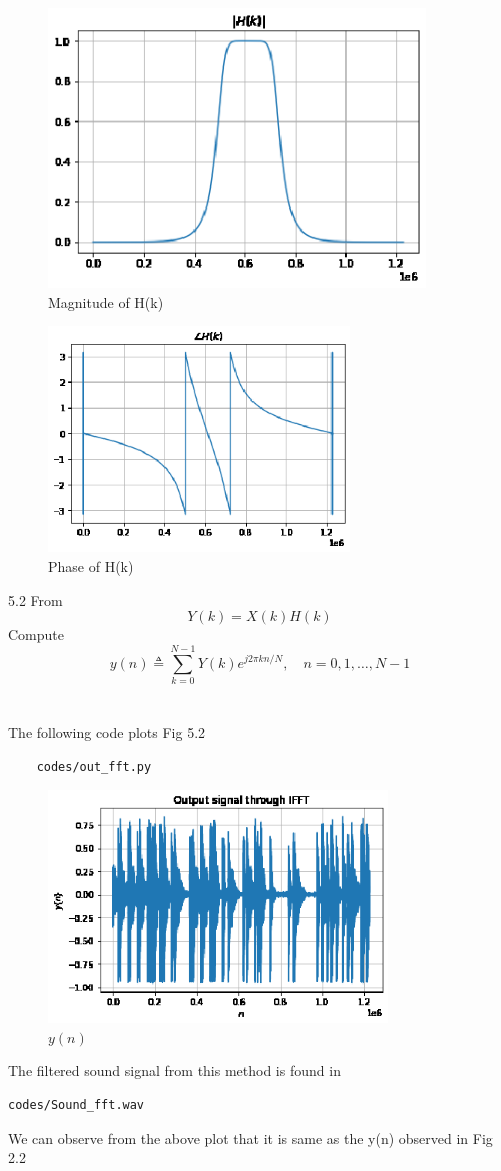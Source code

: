 \documentclass[journal,12pt,twocolumn]{IEEEtran}
\begin{document}
\begin{figure}[!ht]
\centering
\includegraphics[width=10cm]{./figs/abs_hx.eps}
\caption{Magnitude of H(k)}
\label{fig:hfft}
\end{figure}
\newpage
\begin{figure}[!ht]
\centering
\includegraphics[width=8cm]{./figs/phase_hx.eps}
\caption{Phase of H(k)}
\label{fig:hfft}
\end{figure}
5.2 From
\begin{equation}
Y(k) = X(k)H(k)
\end{equation}
Compute
\begin{equation}
y(n) \triangleq \sum_{k=0}^{N-1} Y(k) e^{j 2 \pi k n / N}, \quad n=0,1, \ldots, N-1
\end{equation}
\\
\solution
\\The following code plots Fig 5.2
\begin{lstlisting}
    codes/out_fft.py
\end{lstlisting}
\begin{figure}[!ht]
\centering
\includegraphics[width=9cm]{./figs/output_ifft.eps}
\caption{$y(n)$}
\label{fig:ynfft}
\end{figure}
\newpage
The filtered sound signal from this method is found in
\begin{lstlisting}
codes/Sound_fft.wav
\end{lstlisting}
We can observe from the above plot that it is same as the y(n) observed in Fig 2.2
\end{document}
